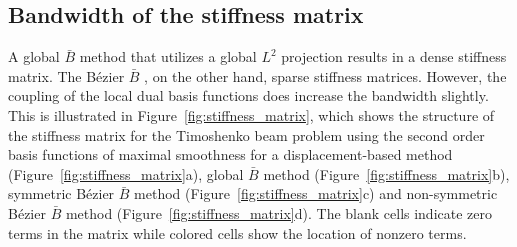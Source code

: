 \documentclass{article}
\newcommand{\Bezier}{{B\'{e}zier} }
\begin{document}
\subsection{Bandwidth of the stiffness matrix}
A global $\bar{B}$ method that utilizes a global $L^2$ projection results in a dense stiffness matrix. The B\'ezier $\bar{B}$ , on the other hand,  sparse stiffness matrices. However, the coupling of the local dual basis functions does increase the bandwidth slightly. This is illustrated in Figure~\ref{fig:stiffness_matrix}, which shows the structure of the stiffness matrix for the Timoshenko beam problem using the second order basis functions of maximal smoothness for a displacement-based method (Figure~\ref{fig:stiffness_matrix}a), global $\bar{B}$ method (Figure~\ref{fig:stiffness_matrix}b), symmetric B\'ezier $\bar{B}$ method (Figure~\ref{fig:stiffness_matrix}c) and non-symmetric \Bezier $\bar{B}$ method (Figure~\ref{fig:stiffness_matrix}d). The blank cells indicate zero terms in the matrix while colored cells show the location of nonzero terms.
\end{document}
